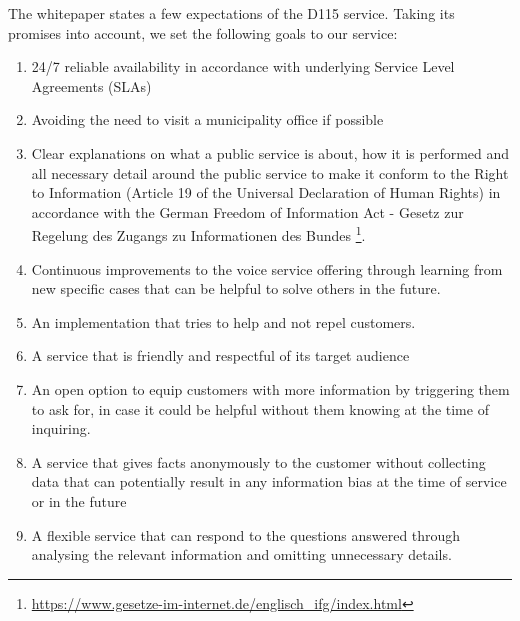 The whitepaper states a few expectations of the D115 service. Taking its promises into account, we set the following goals to our service:
\begin{enumerate}
\item 24/7 reliable availability in accordance with underlying Service Level Agreements (SLAs)

\item Avoiding the need to visit a municipality office if possible

\item Clear explanations on what a public service is about, how it is performed and all necessary detail around the public service to make it conform to the Right to Information (Article 19 of the Universal Declaration of Human Rights) in accordance with the German Freedom of Information Act - Gesetz zur Regelung des Zugangs zu Informationen des Bundes \footnote{\url{ https://www.gesetze-im-internet.de/englisch_ifg/index.html}}.

\item Continuous improvements to the voice service offering through learning from new specific cases that can be helpful to solve others in the future.

\item An implementation that tries to help and not repel customers.

\item A service that is friendly and respectful of its target audience

\item An open option to equip customers with more information by triggering them to ask for, in case it could be helpful without them knowing at the time of inquiring. %

\item A service that gives facts anonymously to the customer without collecting data that can potentially result in any information bias at the time of service or in the future

\item A flexible service that can respond to the questions answered through analysing the relevant information and omitting unnecessary details.



\end{enumerate}





